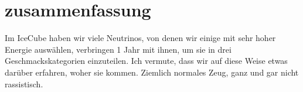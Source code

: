 \chapter{zusammenfassung}
Im IceCube haben wir viele Neutrinos, von denen wir einige mit sehr hoher Energie auswählen, 
verbringen 1 Jahr mit ihnen, um sie in drei Geschmackskategorien einzuteilen. Ich vermute, dass wir auf diese Weise etwas darüber erfahren, woher sie kommen.
Ziemlich normales Zeug, ganz und gar nicht rassistisch.
